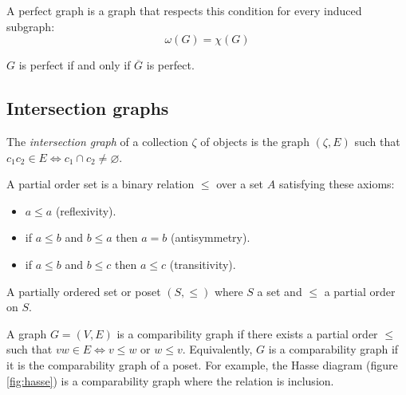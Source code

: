 \begin{defn}
  A perfect graph is a graph that respects this condition for every induced subgraph:
  $$ \omega(G) = \chi(G)$$
\end{defn}

\begin{theorem}[Lovasz]
  $G$ is perfect if and only if $\overline{G}$ is perfect.
\end{theorem}

\subsection{Intersection graphs}

\begin{defn}
The \textit{intersection graph} of a collection $\zeta$ of objects is the graph
$(\zeta,E)$ such that $c_1c_2\in E \Leftrightarrow c_1 \cap c_2 \neq \varnothing$.
\end{defn}


\begin{defn}
  A partial order set is a binary relation $\leq$ over a set $A$ satisfying these axioms:
  \begin{itemize}
    \item $a \leq a$ (reflexivity).
    \item if $a \leq b$ and $b \leq a$ then $a = b$ (antisymmetry).
    \item if $a \leq b$ and $b \leq c$ then $a \leq c$ (transitivity).
  \end{itemize}
\end{defn}

\begin{defn}
   A partially ordered set or poset  $(S,\leq)$ where $S$ a set and $\leq$ a partial
   order on $S$.
\end{defn}

\begin{defn}
  A graph $G = (V,E)$ is a comparibility graph if there exists a partial order
  $\leq$ such that $vw \in E \Leftrightarrow v \leq w$ or $w \leq v$.
  Equivalently, $G$ is a comparability graph if it is the comparability graph of
  a poset. For example, the Hasse diagram (figure \ref{fig:hasse}) is a
  comparability graph where the relation is inclusion.
\end{defn}

